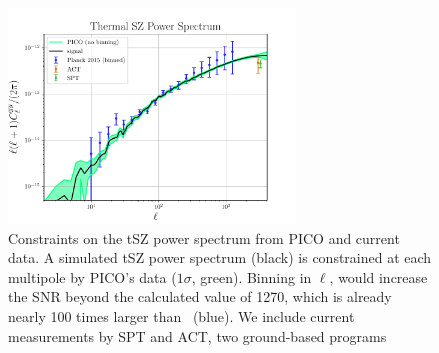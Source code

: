 \documentclass[PICOReport.tex]{subfiles}
\begin{document}
\begin{figure}
\hspace{-0.1in}
\parbox{3.1in}{\centerline{
\includegraphics[width=3.0in]{images/PICO_tSZ_PS_plot.pdf} } }
\hspace{0.in}
\parbox{3.4in}{
\caption{\captiontext  
Constraints on the tSZ power spectrum from PICO and current data.  A simulated tSZ power spectrum (black) is constrained at each multipole by PICO's data ($1\sigma$, green). Binning in $\ell$, would increase the \ac{SNR} beyond the calculated value of 1270, which is already nearly 100 times larger than \planck\ (blue). We include current measurements by SPT and ACT, two ground-based programs~\citep{Sievers2013,George2015}
\label{fig:PICO_tSZ_PS} 
} }
\vspace{-0.1in}
\end{figure}
\end{document}

